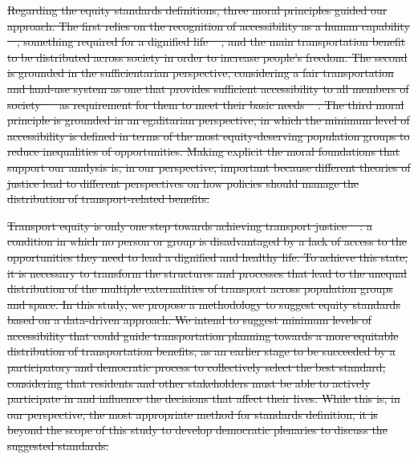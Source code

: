 \documentclass[preprint, 3p,
authoryear]{elsarticle} %
\providecommand{\DIFdeltex}[1]{{\protect\color{red}\sout{#1}}}                      %
\providecommand{\DIFdel}[1]{\texorpdfstring{\DIFdeltex{#1}}{}} %
\begin{document}
\DIFdel{Regarding the equity standards definitions, three moral principles
guided our approach. The first relies on the recognition of
accessibility as a human capability
\mbox{%
\citep{sen2005, sen1999, pereira2017, luz2022}}\hskip0pt%
, something required for a
dignified life \mbox{%
\citep{karner2020}}\hskip0pt%
, and the main transportation benefit
to be distributed across society in order to increase people's freedom.
The second is grounded in the sufficientarian perspective, considering a
fair transportation and land-use system as one that provides sufficient
accessibility to all members of society \mbox{%
\citep{martens2021} }\hskip0pt%
as
requirement for them to meet their basic needs
\mbox{%
\citep{pereira2017, pereira2021}}\hskip0pt%
. The third moral principle is grounded
in an egalitarian perspective, in which the minimum level of
accessibility is defined in terms of the most equity-deserving
population groups to reduce inequalities of opportunities. Making
explicit the moral foundations that support our analysis is, in our
perspective, important because different theories of justice lead to
different perspectives on how policies should manage the distribution of
transport-related benefits.
}%

\DIFdel{Transport equity is only one step towards achieving transport justice
\mbox{%
\citep{karner2020}}\hskip0pt%
: a condition in which no person or group is
disadvantaged by a lack of access to the opportunities they need to lead
a dignified and healthy life. To achieve this state, it is necessary to
transform the structures and processes that lead to the unequal
distribution of the multiple externalities of transport across
population groups and space. In this study, we propose a methodology to
suggest equity standards based on a data-driven approach. We intend to
suggest minimum levels of accessibility that could guide transportation
planning towards a more equitable distribution of transportation
benefits, as an earlier stage to be succeeded by a participatory and
democratic process to collectively select the best standard, considering
that residents and other stakeholders must be able to actively
participate in and influence the decisions that affect their lives.
While this is, in our perspective, the most appropriate method for standards definition, it is beyond the scope of this study to develop
democratic plenaries to discuss the suggested standards.
}%
\end{document}
